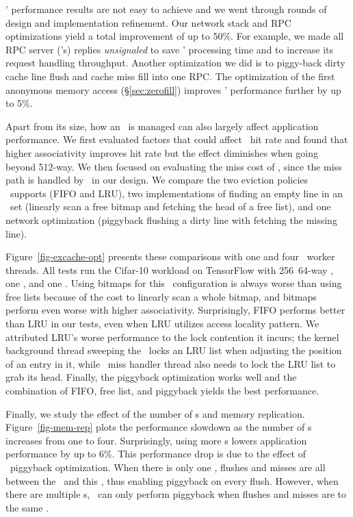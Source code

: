\lego' performance results are not easy to achieve and we went through rounds of design and implementation refinement.
Our network stack and RPC optimizations yield a total improvement of up to 50\%.
For example, we made all RPC server (\mcomponent's) replies {\em unsignaled} to save \mcomponent' processing time
and to increase its request handling throughput.
Another optimization we did is to piggy-back dirty cache line flush and cache miss fill into one RPC.
The optimization of the first anonymous memory access (\S\ref{sec:zerofill}) improves \lego' performance further by up to 5\%.

Apart from its size, how an \excache\ is managed can also largely affect application performance.
We first evaluated factors that could affect \excache\ hit rate and found that higher associativity improves hit rate
but the effect diminishes when going beyond 512-way.
We then focused on evaluating the miss cost of \excache, since the miss path is handled by \lego\ in our design.
We compare the two eviction policies \lego\ supports (FIFO and LRU),
two implementations of finding an empty line in an \excache\ set (linearly scan a free bitmap and fetching the head of a free list),
and one network optimization (piggyback flushing a dirty line with fetching the missing line).

Figure~\ref{fig-excache-opt} presents these comparisons with one and four \mcomponent\ worker threads. 
All tests run the Cifar-10 workload on TensorFlow with 256\MB\ 64-way \excache, one \mcomponent, and one \scomponent.
Using bitmaps for this \excache\ configuration is always worse than using free lists
because of the cost to linearly scan a whole bitmap,
and bitmaps perform even worse with higher associativity.
Surprisingly, FIFO performs better than LRU in our tests, even when LRU utilizes access locality pattern.
We attributed LRU's worse performance to the lock contention it incurs;
the kernel background thread sweeping the \excache\ locks an LRU list when adjusting the position of an entry in it,
while \excache\ miss handler thread also needs to lock the LRU list to grab its head.
Finally, the piggyback optimization works well and the combination of FIFO, free list, and piggyback yields the best performance.


Finally, we study the effect of the number of \mcomponent s and memory replication.
Figure~\ref{fig-mem-rep} plots the performance slowdown as the number of \mcomponent s increases from one to four.
Surprisingly, using more \mcomponent{}s lowers application performance by up to 6\%.
This performance drop is due to the effect of \excache\ piggyback optimization. 
When there is only one \mcomponent, flushes and misses are all between the \pcomponent\ and this \mcomponent,
thus enabling piggyback on every flush.
However, when there are multiple \mcomponent{}s, \lego\ can only perform piggyback when flushes and misses are to the same \mcomponent.

